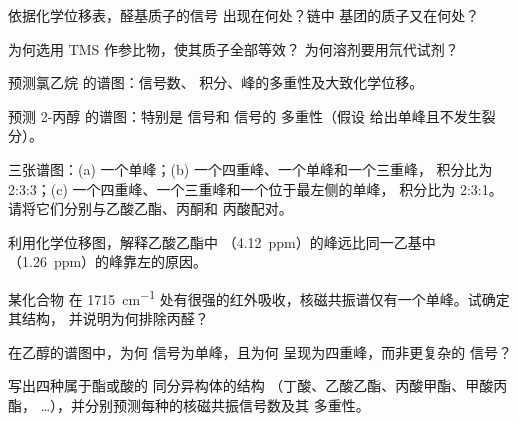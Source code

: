 \begin{exercise}[$\star$]\label{exo:g12:proton-nmr:4}
依据化学位移表，醛基质子的信号
出现在何处？链中  基团的质子又在何处？
\end{exercise}

\begin{exercise}[$\star$]\label{exo:g12:proton-nmr:5}
为何选用 TMS 作参比物，使其质子全部等效？
为何溶剂要用氘代试剂？
\end{exercise}

\begin{exercise}[$\star\star$]\label{exo:g12:proton-nmr:6}
预测氯乙烷  的谱图：信号数、
积分、峰的多重性及大致化学位移。
\end{exercise}

\begin{exercise}[$\star\star$]\label{exo:g12:proton-nmr:7}
预测 2-丙醇  的谱图：特别是  信号和  信号的
多重性（假设
 给出单峰且不发生裂分）。
\end{exercise}

\begin{exercise}[$\star\star$]\label{exo:g12:proton-nmr:8}
三张谱图：(a) 一个单峰；(b) 一个四重峰、一个单峰和一个三重峰，
积分比为 2:3:3；(c) 一个四重峰、一个三重峰和一个位于最左侧的单峰，
积分比为 2:3:1。请将它们分别与乙酸乙酯、丙酮和
丙酸配对。
\end{exercise}

\begin{exercise}[$\star\star$]\label{exo:g12:proton-nmr:9}
利用化学位移图，解释乙酸乙酯中 
（\qty{4.12}{ppm}）的峰远比同一乙基中
（\qty{1.26}{ppm}）的峰靠左的原因。
\end{exercise}

\begin{exercise}[$\star\star$]\label{exo:g12:proton-nmr:10}
某化合物  在
\qty{1715}{cm^{-1}} 处有很强的红外吸收，核磁共振谱仅有一个单峰。试确定其结构，
并说明为何排除丙醛？
\end{exercise}

\begin{exercise}[$\star\star$]\label{exo:g12:proton-nmr:11}
在乙醇的谱图中，为何  信号为单峰，且为何
 呈现为四重峰，而非更复杂的
信号？
\end{exercise}

\begin{exercise}[$\star\star\star$]\label{exo:g12:proton-nmr:12}
写出四种属于酯或酸的  同分异构体的结构
（丁酸、乙酸乙酯、丙酸甲酯、甲酸丙酯，
\dots），并分别预测每种的核磁共振信号数及其
多重性。
\end{exercise}

